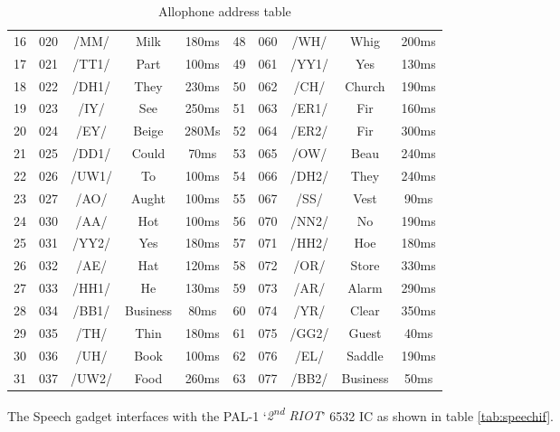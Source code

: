 \begin{table}[h!]
\begin{adjustbox}{center}
\begin{tabular}{|c|c|c|c|c|c|c|c|c|c|}
16 & 020 & /MM/ & Milk & 180ms & 48 & 060 & /WH/ & Whig & 200ms \\
17 & 021 & /TT1/ & Part & 100ms & 49 & 061 & /YY1/ & Yes & 130ms \\
18 & 022 & /DH1/ & They & 230ms & 50 & 062 & /CH/ & Church & 190ms \\
19 & 023 & /IY/ & See & 250ms & 51 & 063 & /ER1/ & Fir & 160ms \\
20 & 024 & /EY/ & Beige & 280Ms & 52 & 064 & /ER2/ & Fir & 300ms \\
21 & 025 & /DD1/ & Could & 70ms & 53 & 065 & /OW/ & Beau & 240ms \\
22 & 026 & /UW1/ & To & 100ms & 54 & 066 & /DH2/ & They & 240ms \\
23 & 027 & /AO/ & Aught & 100ms & 55 & 067 & /SS/ & Vest & 90ms \\
24 & 030 & /AA/ & Hot & 100ms & 56 & 070 & /NN2/ & No & 190ms \\
25 & 031 & /YY2/ & Yes & 180ms & 57 & 071 & /HH2/ & Hoe & 180ms \\
26 & 032 & /AE/ & Hat & 120ms & 58 & 072 & /OR/ & Store & 330ms \\
27 & 033 & /HH1/ & He & 130ms & 59 & 073 & /AR/ & Alarm & 290ms \\
28 & 034 & /BB1/ & Business & 80ms & 60 & 074 & /YR/ & Clear & 350ms \\
29 & 035 & /TH/ & Thin & 180ms & 61 & 075 & /GG2/ & Guest & 40ms \\
30 & 036 & /UH/ & Book & 100ms & 62 & 076 & /EL/ & Saddle & 190ms \\
31 & 037 & /UW2/ & Food & 260ms & 63 & 077 & /BB2/ & Business & 50ms \\
\hline	\end{tabular}
\end{adjustbox}
	\caption{Allophone address table}
	\label{tab:sp0256aat}
\end{table}



The Speech gadget interfaces with the PAL-1 `\textit{2\textsuperscript{nd} RIOT}' 6532 IC as shown in table \ref{tab:speechif}.

